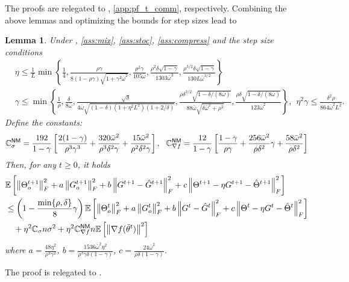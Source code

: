 \documentclass[10pt]{article} %
\theoremstyle{plain}
\newtheorem{lemma}[theorem]{Lemma}
\theoremstyle{definition}
\theoremstyle{remark}
\newcommand{\bw}{\bar{\omega}}
\newcommand{\norm}[1]{\left\| #1 \right\|}
\newcommand{\nl}{\nonumber\\}
\newcommand{\ConstS}{\mathbb{C}_\sigma}
\newcommand{\ConstSS}{\mathbb{C}_\sigma^{\sf NM}}
\newcommand{\ConstFF}{\mathbb{C}_{\nabla f}^{\sf NM}}
\begin{document}
The proofs are relegated to , \ref{app:pf_t_comm}, respectively. 
Combining the above lemmas and optimizing the bounds for step sizes lead to
\begin{lemma} \label{lem:combined}
    Under , \ref{ass:mix}, \ref{ass:stoc}, \ref{ass:compress} and the step size conditions
    \begin{align*}
    & \eta \leq \frac{1}{L} \min \left\{ \frac{1}{4}, \frac{ \rho \gamma }{ 8 (1-\rho\gamma) \sqrt{1 + \gamma^2 \bw^2} }, \frac{ \rho^2 \gamma }{ 105 \bw} , \frac{ \rho^2 \delta \sqrt{1-\gamma} }{ 1303 \bw^2} , \frac{ \rho^{3/2} \delta \sqrt{1-\gamma} }{ 130 L \bw^{3/2} } \right\} \nl
    & \gamma \leq \min \left\{ \frac{1}{\rho}, \frac{\delta}{8\bw}, \frac{\sqrt{\delta} }{ 4 \bw \sqrt{ (1-\delta) (1 + \eta^2 L^2) (1 + 2/\delta)} }, \frac{ \rho \delta^{3/2} \sqrt{1-\delta/(8\bw)} }{ 88 \bw \sqrt{ \delta \bw^2 + \rho^2} }, \frac{ \rho \delta \sqrt{1-\delta/(8\bw)} }{ 123 \bw^2 }  \right\} , ~~ \eta^2 \gamma \leq \frac{\delta^2 \rho}{864 \bw^2 L^2}.
    \end{align*}
    Define the constants: 
    \[
    \ConstSS = \frac{192}{1-\gamma} \left[ \frac{ 2(1-\gamma) }{ \rho^3 \gamma^3 } + \frac{320 \bw^2}{\rho^3 \delta^2 \gamma } + \frac{15 \bw^2}{\rho^2 \delta^2 \gamma } \right],~~\ConstFF = \frac{12}{1-\gamma} \left[ \frac{ 1-\gamma }{ \rho \gamma } + \frac{256 \bw^2}{\rho \delta^2 } \gamma +  \frac{58 \bw^2 }{\rho \delta^2 } \right]
    \]
    Then, for any $t \geq 0$, it holds
    \begin{align}
    & \mathbb{E} \left[ \norm{\Theta_o^{t+1}}_F^2 + a \norm{ G_o^{t+1} }_F^2 + b \norm{ G^{t+1} - \hat{G}^{t+1} }_F^2 + c \norm{ \Theta^{t+1} - \eta G^{t+1} - \hat{\Theta}^{t+1} }_F^2 \right] \nl
    & \leq \left( 1 - \frac{ \min\{ \rho , \delta \} }{8} \gamma \right) \mathbb{E} \left[ \norm{\Theta_o^{t}}_F^2 + a \norm{ G_o^{t} }_F^2 + b \norm{ G^{t} - \hat{G}^{t} }_F^2 + c \norm{ \Theta^{t} - \eta G^{t} - \hat{\Theta}^{t} }_F^2 \right] \nl 
    & \quad + \eta^2 \ConstS n \sigma^2 + \eta^2 \ConstFF n \mathbb{E} \left[ \norm{ \nabla f( \bar{\theta}^t ) }^2 \right] \nonumber
    \end{align}
    where $a = \frac{48 \eta^2}{ \rho^2 \gamma^2}$, $b = \frac{1536 \bw^2 \eta^2}{\rho^3 \gamma \delta (1-\gamma)}$, $c = \frac{ 24 \bw^2 }{ \rho \delta (1-\gamma) }$.
\end{lemma}
    The proof is relegated to .
\end{document}
